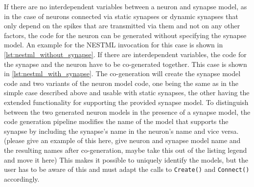If there are no interdependent variables between a neuron and synapse model, as in the case of neurons connected via static synapses or dynamic synapses that only depend on the spikes that are transmitted via them and not on any other factors, the code for the neuron can be generated without specifying the synapse model. An example for the NESTML invocation for this case is shown in \autoref{lst:nestml_without_synapse}. If there are interdependent variables, the code for the synapse and the neuron have to be co-generated together. This case is shown in \autoref{lst:nestml_with_synapse}. The co-generation will create the synapse model code and two variants of the neuron model code, one being the same as in the simple case described above and usable with static synapses, the other having the extended functionality for supporting the provided synapse model. To distinguish between the two generated neuron models in the presence of a synapse model, the code generation pipeline modifies the name of the model that supports the synapse by including the synapse's name in the neuron's name and vice versa. (please give an example of this here, give neuron and synapse model name and the resulting names after co-generation, maybe take this out of the listing legend and move it here) This makes it possible to uniquely identify the models, but the user has to be aware of this and must adapt the calls to \texttt{Create()} and \texttt{Connect()} accordingly.

